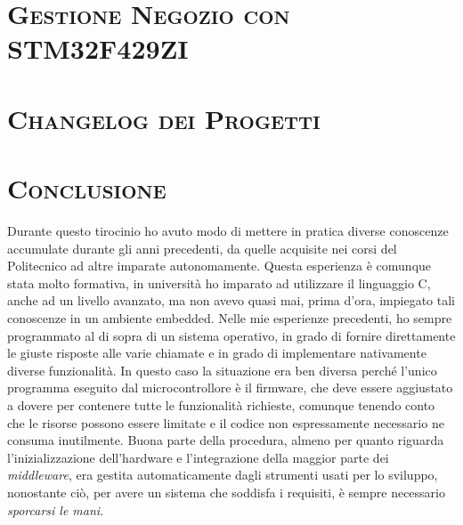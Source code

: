 \documentclass[a4paper,12pt]{article}
\begin{document}
\newpage

\section{\textsc{Gestione Negozio con STM32F429ZI}}



\newpage

\section{\textsc{Changelog dei Progetti}}



\newpage

\section{\textsc{Conclusione}}

Durante questo tirocinio ho avuto modo di mettere in pratica diverse conoscenze accumulate durante gli anni precedenti, da quelle acquisite nei corsi del Politecnico ad altre imparate autonomamente. Questa esperienza \`e comunque stata molto formativa, in universit\`a ho imparato ad utilizzare il linguaggio C, anche ad un livello avanzato, ma non avevo quasi mai, prima d'ora, impiegato tali conoscenze in un ambiente embedded. Nelle mie esperienze precedenti, ho sempre programmato al di sopra di un sistema operativo, in grado di fornire direttamente le giuste risposte alle varie chiamate e in grado di implementare nativamente diverse funzionalit\`a. In questo caso la situazione era ben diversa perch\'e l'unico programma eseguito dal microcontrollore \`e il firmware, che deve essere aggiustato a dovere per contenere tutte le funzionalit\`a richieste, comunque tenendo conto che le risorse possono essere limitate e il codice non espressamente necessario ne consuma inutilmente. Buona parte della procedura, almeno per quanto riguarda l'inizializzazione dell'hardware e l'integrazione della maggior parte dei \textit{middleware}, era gestita automaticamente dagli strumenti usati per lo sviluppo, nonostante ci\`o, per avere un sistema che soddisfa i requisiti, \`e sempre necessario \textit{sporcarsi le mani}.
\end{document}

